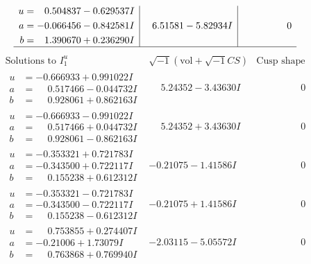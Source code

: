 \documentclass[1p]{elsarticle_modified}
\theoremstyle{definition}
\newcommand{\I}{\sqrt{-1}}
\begin{document}
$$\begin{array}{c|c|c}
\begin{aligned}
u &= \phantom{-}0.504837 - 0.629537 I \\
a &= -0.066456 - 0.842581 I \\
b &= \phantom{-}1.390670 + 0.236290 I\end{aligned}
 & \phantom{-}6.51581 - 5.82934 I & \phantom{-0.000000 } 0\\
 \hline 
 \end{array}$$\newpage$$\begin{array}{c|c|c}  
\text{Solutions to }I^u_{1}& \I (\text{vol} + \sqrt{-1}CS) & \text{Cusp shape}\\
 \hline 
\begin{aligned}
u &= -0.666933 + 0.991022 I \\
a &= \phantom{-}0.517466 - 0.044732 I \\
b &= \phantom{-}0.928061 + 0.862163 I\end{aligned}
 & \phantom{-}5.24352 - 3.43630 I & \phantom{-0.000000 } 0 \\ \hline\begin{aligned}
u &= -0.666933 - 0.991022 I \\
a &= \phantom{-}0.517466 + 0.044732 I \\
b &= \phantom{-}0.928061 - 0.862163 I\end{aligned}
 & \phantom{-}5.24352 + 3.43630 I & \phantom{-0.000000 } 0 \\ \hline\begin{aligned}
u &= -0.353321 + 0.721783 I \\
a &= -0.343500 + 0.722117 I \\
b &= \phantom{-}0.155238 + 0.612312 I\end{aligned}
 & -0.21075 - 1.41586 I & \phantom{-0.000000 } 0 \\ \hline\begin{aligned}
u &= -0.353321 - 0.721783 I \\
a &= -0.343500 - 0.722117 I \\
b &= \phantom{-}0.155238 - 0.612312 I\end{aligned}
 & -0.21075 + 1.41586 I & \phantom{-0.000000 } 0 \\ \hline\begin{aligned}
u &= \phantom{-}0.753855 + 0.274407 I \\
a &= -0.21006 + 1.73079 I \\
b &= \phantom{-}0.763868 + 0.769940 I\end{aligned}
 & -2.03115 - 5.05572 I & \phantom{-0.000000 } 0 \\ \hline\begin{aligned}

\end{aligned}
\end{array}$$
\end{document}
